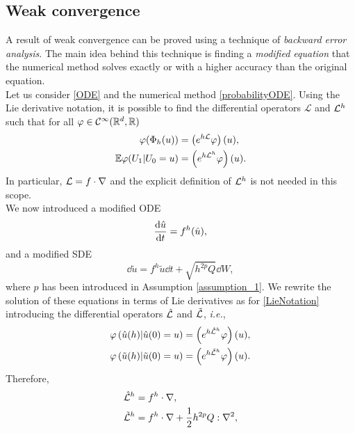 \subsection{Weak convergence}

A result of weak convergence can be proved using a technique of \textit{backward error analysis}. The main idea behind this technique is finding a \textit{modified equation} that the numerical method solves exactly or with a higher accuracy than the original equation. \\
Let us consider \eqref{ODE} and the numerical method \eqref{probabilityODE}. Using the Lie derivative notation, it is possible to find the differential operators $\mathcal{L}$ and $\mathcal{L}^h$ such that for all $\varphi \in \mathcal{C}^\infty(\mathbb{R}^d, \mathbb{R})$ 
\begin{equation}\label{LieNotation}
\begin{aligned}
	\varphi(\Phi_h(u)) &= \left(e^{h\mathcal{L}} \varphi\right)(u), \\
	\mathbb{E}\varphi(U_1 | U_0 = u) &= \left(e^{h\mathcal{L}^h}\varphi\right)(u).
\end{aligned}
\end{equation}
In particular, $\mathcal{L} = f \cdot \nabla$ and the explicit definition of $\mathcal{L}^h$ is not needed in this scope. \\
We now introduced a modified ODE
\begin{equation}\label{modifiedODE}
	\dv{\hat u}{t} = f^h(\hat u), 
\end{equation}
and a modified SDE
\begin{equation}\label{modifiedSDE}
	\dd{\tilde u} = f^h{\tilde u}\dd{t} + \sqrt{h^{2p} Q} \dd{W},
\end{equation}
where $p$ has been introduced in Assumption \ref{assumption_1}. We rewrite the solution of these equations in terms of Lie derivatives as for \eqref{LieNotation} introducing the differential operators $\hat {\mathcal{L}}$ and $\tilde {\mathcal{L}}$, \textit{i.e.},
\begin{equation}\label{LieNotationModif}
\begin{aligned}
	\varphi\left(\hat u(h) | \hat u(0) = u\right) &= \left(e^{h\hat{\mathcal{L}}^h}\varphi\right)(u), \\
	\varphi\left(\tilde u(h)|\tilde u(0) = u\right) &= \left(e^{h\tilde{\mathcal{L}}^h}\varphi\right)(u).
\end{aligned}
\end{equation}
Therefore,
\begin{equation}
\begin{aligned}
	\hat {\mathcal{L}}^h &= f^h \cdot \nabla, \\
	\tilde {\mathcal{L}}^h &= f^h \cdot \nabla + \frac{1}{2} h^{2p} Q : \nabla^2,
\end{aligned}
\end{equation}
